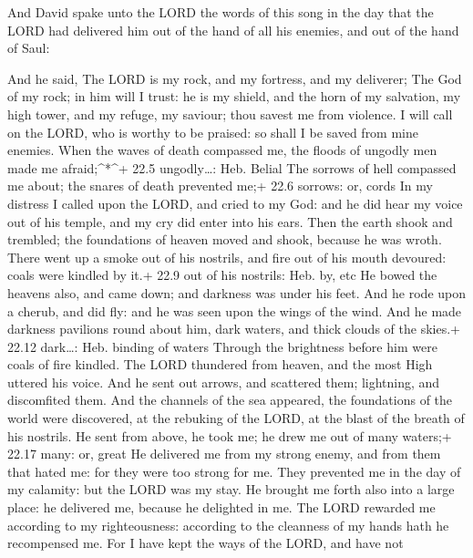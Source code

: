  And David spake unto the LORD the words of this song in the
day that the LORD had delivered him out of the hand of all his enemies,
and out of the hand of Saul:

 And he said, The LORD is my rock, and my fortress, and my
deliverer;  The God of my rock; in him will I trust: he is
my shield, and the horn of my salvation, my high tower, and my refuge,
my saviour; thou savest me from violence.  I will call on
the LORD, who is worthy to be praised: so shall I be saved from mine
enemies.  When the waves of death compassed me, the floods
of ungodly men made me afraid;\^{}*\^{}+ 22.5 ungodly\ldots: Heb. Belial
 The sorrows of hell compassed me about; the snares of death
prevented me;+ 22.6 sorrows: or, cords  In my distress I
called upon the LORD, and cried to my God: and he did hear my voice out
of his temple, and my cry did enter into his ears.  Then the
earth shook and trembled; the foundations of heaven moved and shook,
because he was wroth.  There went up a smoke out of his
nostrils, and fire out of his mouth devoured: coals were kindled by it.+
22.9 out of his nostrils: Heb. by, etc  He bowed the
heavens also, and came down; and darkness was under his feet.
 And he rode upon a cherub, and did fly: and he was seen
upon the wings of the wind.  And he made darkness pavilions
round about him, dark waters, and thick clouds of the skies.+ 22.12
dark\ldots: Heb. binding of waters  Through the brightness
before him were coals of fire kindled.  The LORD thundered
from heaven, and the most High uttered his voice.  And he
sent out arrows, and scattered them; lightning, and discomfited them.
 And the channels of the sea appeared, the foundations of
the world were discovered, at the rebuking of the LORD, at the blast of
the breath of his nostrils.  He sent from above, he took
me; he drew me out of many waters;+ 22.17 many: or, great 
He delivered me from my strong enemy, and from them that hated me: for
they were too strong for me.  They prevented me in the day
of my calamity: but the LORD was my stay.  He brought me
forth also into a large place: he delivered me, because he delighted in
me.  The LORD rewarded me according to my righteousness:
according to the cleanness of my hands hath he recompensed me.
 For I have kept the ways of the LORD, and have not
